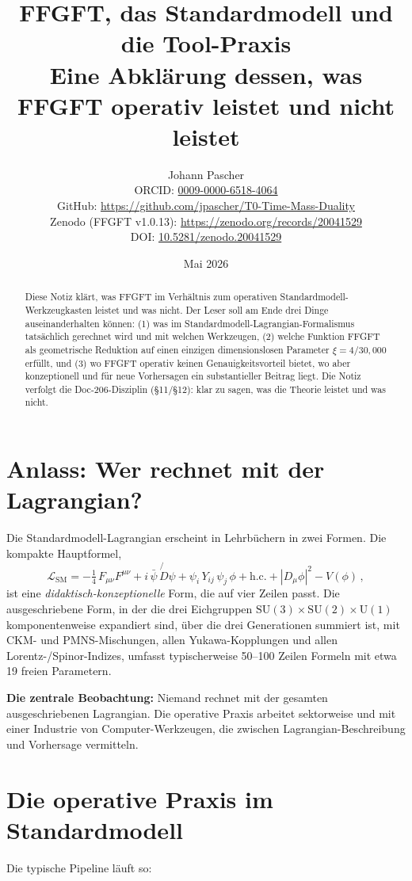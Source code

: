 \documentclass[11pt,a4paper]{article}
\title{FFGFT, das Standardmodell und die Tool-Praxis\\[2pt]
  \large Eine Abklärung dessen, was FFGFT operativ leistet und nicht leistet}
\author{Johann Pascher\\[2pt]
\small ORCID: \href{https://orcid.org/0009-0000-6518-4064}{0009-0000-6518-4064}\\
\small GitHub: \url{https://github.com/jpascher/T0-Time-Mass-Duality}\\
\small Zenodo (FFGFT v1.0.13): \url{https://zenodo.org/records/20041529}\\
\small DOI: \href{https://doi.org/10.5281/zenodo.20041529}{10.5281/zenodo.20041529}}
\date{Mai 2026}
\begin{document}
\maketitle

\begin{abstract}
\noindent Diese Notiz klärt, was FFGFT im Verhältnis zum operativen Standardmodell-Werkzeugkasten leistet und was nicht. Der Leser soll am Ende drei Dinge auseinanderhalten können: (1) was im Standardmodell-Lagrangian-Formalismus tatsächlich gerechnet wird und mit welchen Werkzeugen, (2) welche Funktion FFGFT als geometrische Reduktion auf einen einzigen dimensionslosen Parameter $\xi = 4/30{,}000$ erfüllt, und (3) wo FFGFT operativ keinen Genauigkeitsvorteil bietet, wo aber konzeptionell und für neue Vorhersagen ein substantieller Beitrag liegt. Die Notiz verfolgt die Doc-206-Disziplin (\S 11/\S 12): klar zu sagen, was die Theorie leistet und was nicht.
\end{abstract}

\section{Anlass: Wer rechnet mit der Lagrangian?}

Die Standardmodell-Lagrangian erscheint in Lehrbüchern in zwei Formen. Die kompakte Hauptformel,
\[
\mathcal{L}_{\mathrm{SM}} = -\tfrac{1}{4}\,F_{\mu\nu}F^{\mu\nu} + i\,\bar\psi\,\!\not{\!D}\psi + \psi_i\,Y_{ij}\,\psi_j\,\phi + \mathrm{h.c.} + |D_\mu\phi|^2 - V(\phi)\,,
\]
ist eine \emph{didaktisch-konzeptionelle} Form, die auf vier Zeilen passt. Die ausgeschriebene Form, in der die drei Eichgruppen $\mathrm{SU}(3)\times\mathrm{SU}(2)\times\mathrm{U}(1)$ komponentenweise expandiert sind, über die drei Generationen summiert ist, mit CKM- und PMNS-Mischungen, allen Yukawa-Kopplungen und allen Lorentz-/Spinor-Indizes, umfasst typischerweise 50--100 Zeilen Formeln mit etwa 19 freien Parametern.

\textbf{Die zentrale Beobachtung:} Niemand rechnet mit der gesamten ausgeschriebenen Lagrangian. Die operative Praxis arbeitet sektorweise und mit einer Industrie von Computer-Werkzeugen, die zwischen Lagrangian-Beschreibung und Vorhersage vermitteln.

\section{Die operative Praxis im Standardmodell}

Die typische Pipeline läuft so:
\end{document}
